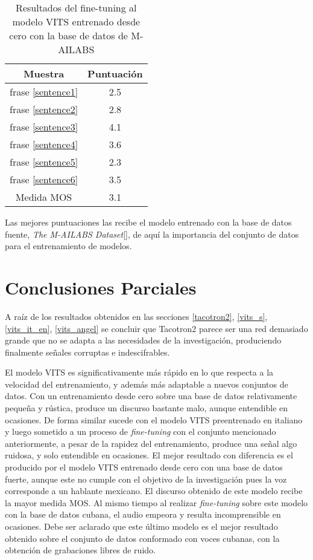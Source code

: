 \begin{table}[H]
	\begin{center} 
		\begin{tabular}{ |c|c| } 
			\hline
			Muestra & Puntuación \\
			\hline
			frase \ref{sentence1} & 2.5 \\
			frase \ref{sentence2} & 2.8 \\
			frase \ref{sentence3} & 4.1 \\
			frase \ref{sentence4} & 3.6 \\
			frase \ref{sentence5} & 2.3 \\
			frase \ref{sentence6} & 3.5 \\
			\hline
			Medida MOS & 3.1\\
			\hline
		\end{tabular}
		\caption{Resultados del fine-tuning al modelo VITS entrenado desde cero con la base de datos de M-AILABS} 
	\end{center}
\end{table}

Las mejores puntuaciones las recibe el modelo entrenado con la base de datos fuente, \textit{The M-AILABS Dataset}[\cite{mailabs}], de aquí la importancia del conjunto de datos para el entrenamiento de modelos.\\

\section{Conclusiones Parciales}

A raíz de los resultados obtenidos en las secciones \ref{tacotron2}, \ref{vits_s}, \ref{vits_it_en}, \ref{vits_angel} se concluir que Tacotron2 parece ser una red demasiado grande que no se adapta a las necesidades de la investigación, produciendo finalmente señales corruptas e indescifrables.

El modelo VITS es significativamente más rápido en lo que respecta a la velocidad del entrenamiento, y además más adaptable a nuevos conjuntos de datos. Con un entrenamiento desde cero sobre una base de datos relativamente pequeña y rústica, produce un discurso bastante malo, aunque entendible en ocasiones. De forma similar sucede con el modelo VITS preentrenado en italiano y luego sometido a un proceso de \textit{fine-tuning} con el conjunto mencionado anteriormente, a pesar de la rapidez del entrenamiento, produce una señal algo ruidosa, y solo entendible en ocasiones. El mejor resultado con diferencia es el producido por el modelo VITS entrenado desde cero con una base de datos fuerte, aunque este no cumple con el objetivo de la investigación pues la voz corresponde a un hablante mexicano. El discurso obtenido de este modelo recibe la mayor medida MOS. Al mismo tiempo al realizar \textit{fine-tuning} sobre este modelo con la base de datos cubana, el audio empeora y resulta incomprensible en ocasiones. Debe ser aclarado que este último modelo es el mejor resultado obtenido sobre el conjunto de datos conformado con voces cubanas, con la obtención de grabaciones libres de ruido. 




